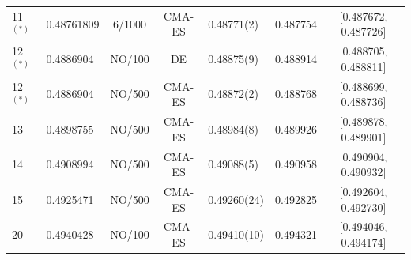 \documentclass[11pt]{article}
\begin{document}
\begin{table}[htbp]
{\begin{tabular}{l l c c l l c }
        11$^{(*)}$  & 0.48761809       & 6/1000   & CMA-ES   & 0.48771(2)    & 0.487754 & [0.487672, 0.487726]\\
        12$^{(*)}$  & 0.4886904        & NO/100  & DE       & 0.48875(9)    & 0.488914 & [0.488705, 0.488811]\\
        12$^{(*)}$  & 0.4886904        & NO/500  & CMA-ES   & 0.48872(2)    & 0.488768 & [0.488699, 0.488736]\\
        13          & 0.4898755        & NO/500  & CMA-ES   & 0.48984(8)    & 0.489926 & [0.489878, 0.489901]\\
        14          & 0.4908994        & NO/500  & CMA-ES   & 0.49088(5)    & 0.490958 & [0.490904, 0.490932]\\ 
        15          & 0.4925471        & NO/500  & CMA-ES   & 0.49260(24)   & 0.492825 & [0.492604, 0.492730]\\
        20          & 0.4940428        & NO/100  & CMA-ES   & 0.49410(10)   & 0.494321 & [0.494046, 0.494174]\\
        \hline
    \end{tabular}
}
\end{table}
\end{document}
